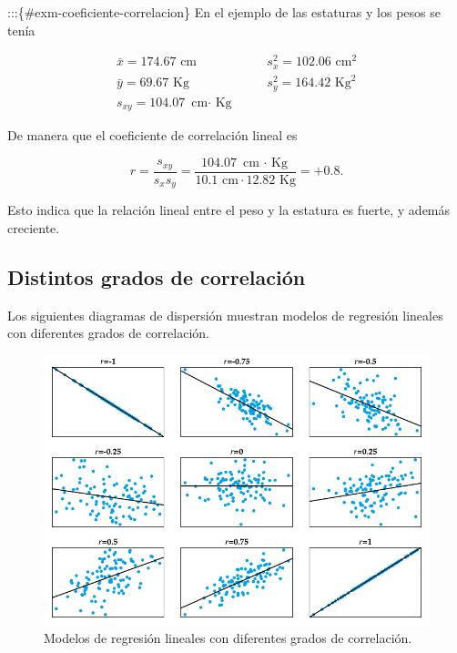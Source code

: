 \documentclass[
  a4paper,
]{scrreport}
\theoremstyle{plain}
\theoremstyle{definition}
\theoremstyle{definition}
\theoremstyle{remark}
\begin{document}
:::\{\#exm-coeficiente-correlacion\} En el ejemplo de las estaturas y
los pesos se tenía

\[
\begin{array}{lll}
\bar x = 174.67 \mbox{ cm} & \quad & s^2_x = 102.06 \mbox{ cm}^2\\
\bar y = 69.67 \mbox{ Kg} & & s^2_y = 164.42 \mbox{ Kg}^2\\
s_{xy} = 104.07 \mbox{ cm$\cdot$ Kg}
\end{array}
\]

De manera que el coeficiente de correlación lineal es

\[
r 
= \frac{s_{xy}}{s_xs_y} 
= \frac{104.07 \mbox{ cm $\cdot$ Kg}}{10.1 \mbox{ cm} \cdot 12.82 \mbox{ Kg}} 
= +0.8.
\]

Esto indica que la relación lineal entre el peso y la estatura es
fuerte, y además creciente.

\subsection{Distintos grados de
correlación}\label{distintos-grados-de-correlaciuxf3n}

Los siguientes diagramas de dispersión muestran modelos de regresión
lineales con diferentes grados de correlación.

\begin{figure}[H]

{\centering \includegraphics[width=6.25in,height=\textheight]{img/regresion/grados_correlacion.pdf}

}

\caption{Modelos de regresión lineales con diferentes grados de
correlación.}

\end{figure}%
\end{document}
